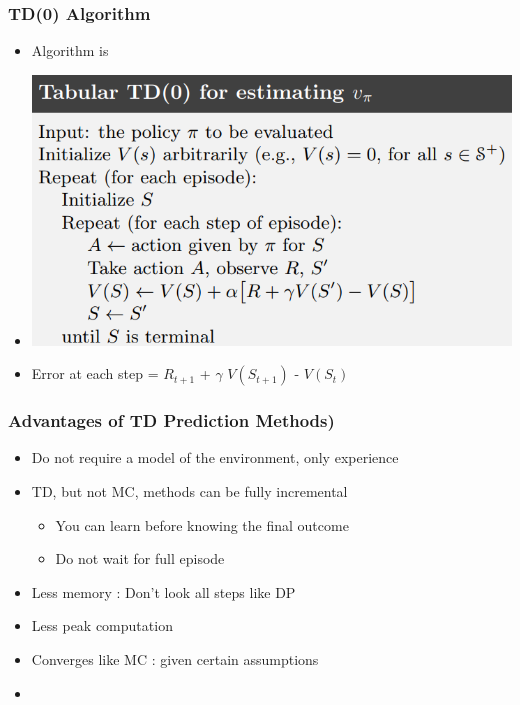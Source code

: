 \documentclass{beamer} %
\begin{document}
\begin{frame}
\frametitle{TD(0) Algorithm }
	\begin{itemize}
		\item Algorithm is
		\item \includegraphics[height=.4\textheight, width=.4\textwidth]{tdZeroAlgo.png}
		\item Error at each step =  $R_{t+1}$ + $\gamma$ $V({S}_{t+1})$ - $V({S}_{t})$

	\end{itemize}
	
\end{frame}




\begin{frame}
\frametitle{Advantages of TD Prediction Methods)}
\begin{itemize}
	\item Do not require a model of the environment, only experience
	\item TD, but not MC, methods can be fully incremental
		\begin{itemize}
			\item You can learn before knowing the final outcome
			\item Do not wait for full episode
		\end{itemize}
	\item Less memory : Don't look all steps like DP
	\item Less peak computation
	\item Converges like MC : given certain assumptions 
	\item 
	
\end{itemize}

\end{frame}
\end{document}
